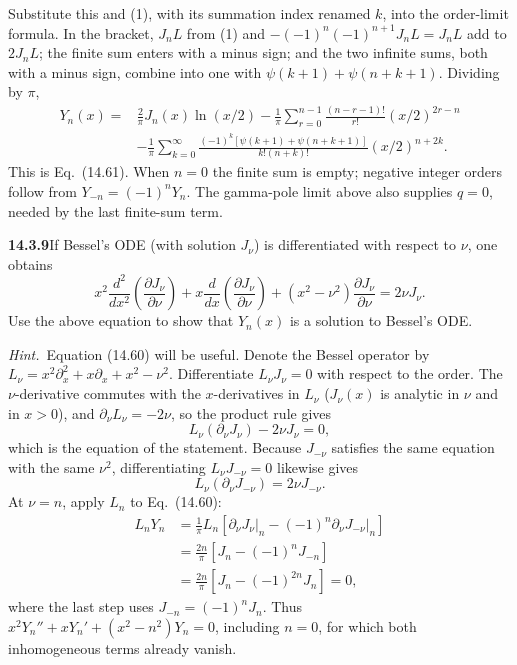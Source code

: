 Substitute this and (1), with its summation index renamed $k$, into
the order-limit formula. In the bracket, $J_nL$ from (1) and
$-(-1)^n(-1)^{n+1}J_nL=J_nL$ add to $2J_nL$; the finite sum enters
with a minus sign; and the two infinite sums, both with a minus
sign, combine into one with $\psi(k+1)+\psi(n+k+1)$. Dividing by
$\pi$,
\[
\boxed{\begin{aligned}
Y_n(x)={}&\frac2\pi J_n(x)\ln(x/2)
-\frac1\pi\sum_{r=0}^{n-1}\frac{(n-r-1)!}{r!}(x/2)^{2r-n}\\
&-\frac1\pi\sum_{k=0}^\infty
\frac{(-1)^k[\psi(k+1)+\psi(n+k+1)]}{k!(n+k)!}(x/2)^{n+2k}.
\end{aligned}}
\]
This is Eq.~(14.61). When $n=0$ the finite sum is empty; negative
integer orders follow from $Y_{-n}=(-1)^nY_n$. The gamma-pole
limit above also supplies $q=0$, needed by the last finite-sum term.

\par\bigskip
\noindent\textbf{14.3.9}\quad If Bessel's ODE (with solution $J_{\nu}$)
is differentiated with respect to $\nu$, one obtains
\[
x^{2}\frac{d^{2}}{dx^{2}}\left(\frac{\partial J_{\nu}}{\partial\nu}\right)
+x\frac{d}{dx}\left(\frac{\partial J_{\nu}}{\partial\nu}\right)
+(x^{2}-\nu^{2})\frac{\partial J_{\nu}}{\partial\nu}=2\nu J_{\nu}.
\]
Use the above equation to show that $Y_{n}(x)$ is a solution to
Bessel's ODE.
\par\emph{Hint.}~Equation (14.60) will be useful.
\solution
Denote the Bessel operator by
$L_\nu=x^2\partial_x^2+x\partial_x+x^2-\nu^2$.
Differentiate $L_\nu J_\nu=0$ with respect to the order. The
$\nu$-derivative commutes with the $x$-derivatives in $L_\nu$
($J_\nu(x)$ is analytic in $\nu$ and in $x>0$), and
$\partial_\nu L_\nu=-2\nu$, so the product rule gives
\[
L_\nu(\partial_\nu J_\nu)-2\nu J_\nu=0,
\]
which is the equation of the statement.
Because $J_{-\nu}$ satisfies the same equation with the same
$\nu^2$, differentiating $L_\nu J_{-\nu}=0$ likewise gives
\[
L_\nu(\partial_\nu J_{-\nu})=2\nu J_{-\nu}.
\]
At $\nu=n$, apply $L_n$ to Eq.~(14.60):
\begin{align*}
L_nY_n
&=\frac1\pi L_n\left[
\left.\partial_\nu J_\nu\right|_n
-(-1)^n\left.\partial_\nu J_{-\nu}\right|_n\right]\\
&=\frac{2n}{\pi}[J_n-(-1)^nJ_{-n}]\\
&=\frac{2n}{\pi}[J_n-(-1)^{2n}J_n]=0,
\end{align*}
where the last step uses $J_{-n}=(-1)^nJ_n$.
Thus $\boxed{x^2Y_n''+xY_n'+(x^2-n^2)Y_n=0}$, including
$n=0$, for which both inhomogeneous terms already vanish.

